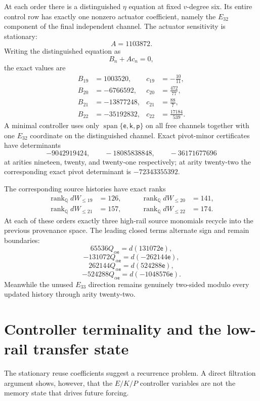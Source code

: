 \documentclass[11pt]{amsart}
\newcommand{\Span}{\operatorname{span}}
\newcommand{\rank}{\operatorname{rank}}
\newcommand{\Q}{\mathbb Q}
\begin{document}
At each order there is a distinguished $\eta$ equation at fixed $v$-degree six.  Its entire control row has exactly one nonzero actuator coefficient, namely the $E_{32}$ component of the final independent channel.  The actuator sensitivity is stationary:
\begin{equation}\label{eq:stationary-sensitivity}
\boxed{A=1103872.}
\end{equation}
Writing the distinguished equation as
\[
B_n+A c_n=0,
\]
the exact values are
\begin{align*}
B_{19}&=1003520,& c_{19}&=-\frac{10}{11},\\
B_{20}&=-6766592,& c_{20}&=\frac{472}{77},\\
B_{21}&=-13877248,& c_{21}&=\frac{88}{7},\\
B_{22}&=-35192832,& c_{22}&=\frac{17184}{539}.
\end{align*}
A minimal controller uses only $\Span\{\mathsf e,\mathsf k,\mathsf p\}$ on all free channels together with one $E_{32}$ coordinate on the distinguished channel.  Exact pivot-minor certificates have determinants
\[
-9042919424,
\qquad
-18085838848,
\qquad
-36171677696
\]
at arities nineteen, twenty, and twenty-one respectively; at arity twenty-two the corresponding exact pivot determinant is $-72343355392$.

The corresponding source histories have exact ranks
\[
\begin{aligned}
\rank_\Q dW_{\le19}&=126,
&\qquad
\rank_\Q dW_{\le20}&=141,\\
\rank_\Q dW_{\le21}&=157,
&\qquad
\rank_\Q dW_{\le22}&=174.
\end{aligned}
\]
At each of these orders exactly three high-rail source monomials recycle into the previous provenance space.  The leading closed terms alternate sign and remain boundaries:
\[
65536Q_{\alpha\mathsf e}=d(131072\mathsf e),
\]
\[
-131072Q_{\alpha\mathsf e}=d(-262144\mathsf e),
\]
\[
262144Q_{\alpha\mathsf e}=d(524288\mathsf e),
\]
\[
-524288Q_{\alpha\mathsf e}=d(-1048576\mathsf e).
\]
Meanwhile the unused $E_{33}$ direction remains genuinely two-sided modulo every updated history through arity twenty-two.

\section{Controller terminality and the low-rail transfer state}\label{sec:low-rail}

The stationary reuse coefficients suggest a recurrence problem.  A direct filtration argument shows, however, that the $E/K/P$ controller variables are not the memory state that drives future forcing.
\end{document}
